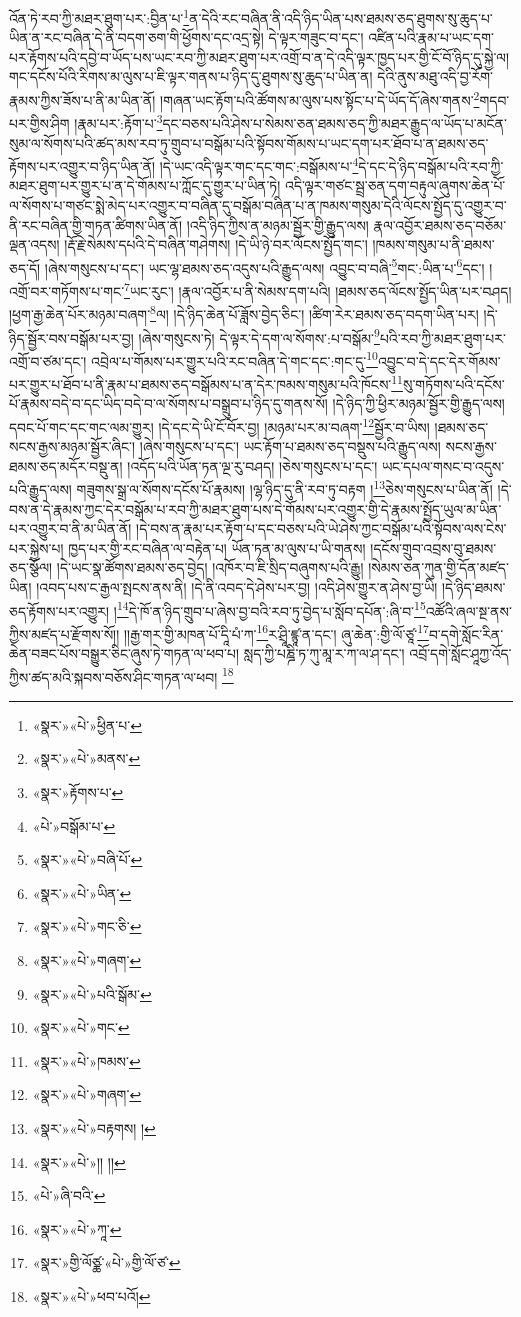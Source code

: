 འོན་ཏེ་རབ་ཀྱི་མཐར་ཐུག་པར་:བྱིན་པ་\footnote{«སྣར་»«པེ་»ཕྱིན་པ་}ན་དེའི་རང་བཞིན་ནི་འདི་ཉིད་ཡིན་པས་ཐམས་ཅད་ཐུགས་སུ་ཆུད་པ་ཡིན་ན་རང་བཞིན་དེ་ནི་བདག་ཅག་གི་ཕྱོགས་དང་འདྲ་སྟེ། དེ་ལྟར་གཟུང་བ་དང་། འཛིན་པའི་རྣམ་པ་ཡང་དག་པར་རྟོགས་པའི་དབྱེ་བ་ཡོད་པས་ཡང་རབ་ཀྱི་མཐར་ཐུག་པར་འགྲོ་བ་ན་དེ་འདི་ལྟར་ཁྱད་པར་གྱི་ངོ་བོ་ཉིད་དུ་སྐྱེ་ལ། གང་དངོས་པོའི་རིགས་མ་ལུས་པ་ཇི་ལྟར་གནས་པ་ཉིད་དུ་ཐུགས་སུ་ཆུད་པ་ཡིན་ན། དེའི་ནུས་མཐུ་འདི་བྱ་རོག་རྣམས་ཀྱིས་ཟོས་པ་ནི་མ་ཡིན་ནོ། །གཞན་ཡང་རྟོག་པའི་ཚོགས་མ་ལུས་པས་སྟོང་པ་དེ་ཡོད་དོ་ཞེས་གནས་\footnote{«སྣར་»«པེ་»མནས་}གདབ་པར་གྱིས་ཤིག །རྣམ་པར་:རྟོག་པ་\footnote{«སྣར་»རྟོགས་པ་}དང་བཅས་པའི་ཤེས་པ་སེམས་ཅན་ཐམས་ཅད་ཀྱི་མཐར་རྒྱུད་ལ་ཡོད་པ་མངོན་སུམ་ལ་སོགས་པའི་ཚད་མས་རབ་ཏུ་གྲུབ་པ་བསྒོམ་པའི་སྟོབས་གོམས་པ་ཡང་དག་པར་ཐོབ་པ་ན་ཐམས་ཅད་རྟོགས་པར་འགྱུར་བ་ཉིད་ཡིན་ནོ། །དེ་ཡང་འདི་ལྟར་གང་དང་གང་:བསྒོམས་པ་\footnote{«པེ་»བསྒོམ་པ་}དེ་དང་དེ་ཉིད་བསྒོམ་པའི་རབ་ཀྱི་མཐར་ཐུག་པར་གྱུར་པ་ན་དེ་གོམས་པ་ཀློང་དུ་གྱུར་པ་ཡིན་ཏེ། འདི་ལྟར་གཙང་སྦྲ་ཅན་དག་བརྟུལ་ཞུགས་ཆེན་པོ་ལ་སོགས་པ་གཙང་སྨེ་མེད་པར་འགྱུར་བ་བཞིན་དུ་བསྒོམ་བཞིན་པ་ན་ཁམས་གསུམ་དེའི་ལོངས་སྤྱོད་དུ་འགྱུར་བ་ནི་རང་བཞིན་གྱི་གཏན་ཚིགས་ཡིན་ནོ། །འདི་ཉིད་ཀྱིས་ན་མཉམ་སྦྱོར་གྱི་རྒྱུད་ལས། རྣལ་འབྱོར་ཐམས་ཅད་བཅོམ་ལྡན་འདས། །རྡོ་རྗེ་སེམས་དཔའི་དེ་བཞིན་གཤེགས། །དེ་ཡི་ཉེ་བར་ལོངས་སྤྱོད་གང་། །ཁམས་གསུམ་པ་ནི་ཐམས་ཅད་དོ། །ཞེས་གསུངས་པ་དང་། ཡང་ལྷ་ཐམས་ཅད་འདུས་པའི་རྒྱུད་ལས། འབྱུང་བ་བཞི་\footnote{«སྣར་»«པེ་»བཞི་པོ་}གང་:ཡིན་པ་\footnote{«སྣར་»«པེ་»ཡིན་}དང་། །འགྲོ་བར་གཏོགས་པ་གང་\footnote{«སྣར་»«པེ་»གང་ཅི་}ཡང་རུང་། །རྣལ་འབྱོར་པ་ནི་སེམས་དག་པའི། །ཐམས་ཅད་ལོངས་སྤྱོད་ཡིན་པར་བཤད། །ཕྱག་རྒྱ་ཆེན་པོར་མཉམ་བཞག་\footnote{«སྣར་»«པེ་»གཞག་}ལ། །དེ་ཉིད་ཆེན་པོ་ཟློས་བྱེད་ཅིང་། །ཚིག་རེར་ཐམས་ཅད་བདག་ཡིན་པར། །དེ་ཉིད་སྦྱོར་བས་བསྒོམ་པར་བྱ། །ཞེས་གསུངས་ཏེ། དེ་ལྟར་དེ་དག་ལ་སོགས་:པ་བསྒོམ་\footnote{«སྣར་»«པེ་»པའི་སྒོམ་}པའི་རབ་ཀྱི་མཐར་ཐུག་པར་འགྲོ་བ་ཙམ་དང་། འབྲེལ་པ་གོམས་པར་གྱུར་པའི་རང་བཞིན་དེ་གང་དང་:གང་དུ་\footnote{«སྣར་»«པེ་»གང་}འབྱུང་བ་དེ་དང་དེར་གོམས་པར་གྱུར་པ་ཐོབ་པ་ནི་རྣམ་པ་ཐམས་ཅད་བསྒོམས་པ་ན་དེར་ཁམས་གསུམ་པའི་ཁོངས་\footnote{«སྣར་»«པེ་»ཁམས་}སུ་གཏོགས་པའི་དངོས་པོ་རྣམས་བདེ་བ་དང་ཡིད་བདེ་བ་ལ་སོགས་པ་བསྒྲུབ་པ་ཉིད་དུ་གནས་སོ། །དེ་ཉིད་ཀྱི་ཕྱིར་མཉམ་སྦྱོར་གྱི་རྒྱུད་ལས། དབང་པོ་གང་དང་གང་ལམ་གྱུར། །དེ་དང་དེ་ཡི་ངོ་བོར་བྱ། །མཉམ་པར་མ་བཞག་\footnote{«སྣར་»«པེ་»གཞག་}སྦྱོར་བ་ཡིས། །ཐམས་ཅད་སངས་རྒྱས་མཉམ་སྦྱོར་ཞིང་། །ཞེས་གསུངས་པ་དང་། ཡང་རྟོག་པ་ཐམས་ཅད་བསྡུས་པའི་རྒྱུད་ལས། སངས་རྒྱས་ཐམས་ཅད་མདོར་བསྡུ་ན། །འདོད་པའི་ཡོན་ཏན་ལྔ་རུ་བཤད། །ཅེས་གསུངས་པ་དང་། ཡང་དཔལ་གསང་བ་འདུས་པའི་རྒྱུད་ལས། གཟུགས་སྒྲ་ལ་སོགས་དངོས་པོ་རྣམས། །ལྷ་ཉིད་དུ་ནི་རབ་ཏུ་བརྟག །\footnote{«སྣར་»«པེ་»བརྟགས། །}ཅེས་གསུངས་པ་ཡིན་ནོ། །དེ་བས་ན་དེ་རྣམས་ཀྱང་དེར་བསྒོམ་པ་རབ་ཀྱི་མཐར་ཐུག་པས་དེ་གོམས་པར་འགྱུར་གྱི་དེ་རྣམས་སྤྱོད་ཡུལ་མ་ཡིན་པར་འགྱུར་བ་ནི་མ་ཡིན་ནོ། །དེ་བས་ན་རྣམ་པར་རྟོག་པ་དང་བཅས་པའི་ཡེ་ཤེས་ཀྱང་བསྒོམ་པའི་སྟོབས་ལས་ངེས་པར་སྐྱེས་པ། ཁྱད་པར་གྱི་རང་བཞིན་ལ་བརྟེན་པ། ཡོན་ཏན་མ་ལུས་པ་ཡི་གནས། །དངོས་གྲུབ་འབྲས་བུ་ཐམས་ཅད་སྩོལ། །དེ་ཡང་སྣ་ཚོགས་ཐམས་ཅད་བྱེད། །འཁོར་བ་ཇི་སྲིད་བཞུགས་པའི་རྒྱུ། །སེམས་ཅན་ཀུན་གྱི་དོན་མཛད་ཡིན། །འབད་པས་ང་རྒྱལ་སྤངས་ནས་ནི། །དེ་ནི་འབད་དེ་ཤེས་པར་བྱ། །འདི་ཤེས་གྱུར་ན་ཤེས་བྱ་ཡི། །དེ་ཉིད་ཐམས་ཅད་རྟོགས་པར་འགྱུར། །\footnote{«སྣར་»«པེ་»།། །།}དེ་ཁོ་ན་ཉིད་གྲུབ་པ་ཞེས་བྱ་བའི་རབ་ཏུ་བྱེད་པ་སློབ་དཔོན་:ཞི་བ་\footnote{«པེ་»ཞི་བའི་}འཚོའི་ཞལ་སྔ་ནས་ཀྱིས་མཛད་པ་རྫོགས་སོ།། །།རྒྱ་གར་གྱི་མཁན་པོ་དཱི་པཾ་ཀ་\footnote{«སྣར་»«པེ་»ཀཱ་}ར་ཤྲཱི་ཛྙཱ་ན་དང་། ཞུ་ཆེན་:གྱི་ལོ་ཙཱ་\footnote{«སྣར་»གྱི་ལོཙྪ་«པེ་»གྱི་ལོ་ཙ་}བ་དགེ་སློང་རིན་ཆེན་བཟང་པོས་བསྒྱུར་ཅིང་ཞུས་ཏེ་གཏན་ལ་ཕབ་པ། སླད་ཀྱི་པཎྜི་ཏ་ཀུ་མཱ་ར་ཀ་ལ་ཤ་དང་། འབྲོ་དགེ་སློང་ཤཱཀྱ་འོད་ཀྱིས་ཚད་མའི་སྐབས་བཅོས་ཤིང་གཏན་ལ་ཕབ། \footnote{«སྣར་»«པེ་»ཕབ་པའོ། }
